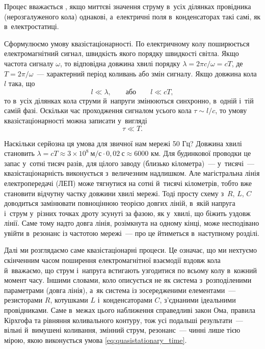 Процес вважається , якщо миттєві значення струму в~усіх ділянках провідника (нерозгалуженого кола) однакові, а~електричні поля в~конденсаторах такі самі, як в~електростатиці.

Сформулюємо умову квазістаціонарності. По електричному колу поширюється електромагнітний сигнал, швидкість якого порядку швидкості світла. Якщо частота сигналу $\omega$, то відповідна довжина хвилі порядку $\lambda = 2\pi c/\omega = cT$, де $T = 2\pi/\omega$~--- характерний період коливань або змін сигналу. Якщо довжина кола $l$ така, що
\begin{equation}\label{eq:quasistationary_condition}
	l \ll \lambda, \qquad \text{або} \qquad l \ll cT,
\end{equation}
то в~усіх ділянках кола струми й~напруги змінюються синхронно, в~одній і~тій самій фазі. Оскільки час проходження сигналом усього кола $\tau \sim l/c$, то умову квазістаціонарності можна записати у~вигляді
\begin{equation}\label{eq:quasistationary_time}
	\tau \ll T.
\end{equation}

\begin{Attention}
	Наскільки серйозна ця умова для звичної нам мережі 50 Гц? Довжина хвилі становить $\lambda = cT \approx 3\times10^{8}\ \text{м/с}\cdot 0{,}02\ \text{с} \approx 6000$ км. Для будинкової проводки це запас у~сотні тисяч разів, для цілого заводу (близько кілометра)~--- у~тисячі~--- квазістаціонарність виконується з~величезним надлишком. Але магістральна лінія електропередачі (ЛЕП) може тягнутися на сотні й~тисячі кілометрів, тобто вже становити відчутну частку довжини хвилі мережі. Тоді просту схему з~$R$, $L$, $C$ доводиться замінювати повноцінною теорією довгих ліній, в~якій напруга і~струм у~різних точках дроту зсунуті за фазою, як у~хвилі, що біжить уздовж лінії. Саме тому надто довга лінія, розімкнута на одному кінці, може несподівано увійти в~резонанс із частотою мережі~--- про це йтиметься в~наступному розділі.
\end{Attention}

Далі ми розглядаємо саме квазістаціонарні процеси. Це означає, що ми нехтуємо скінченним часом поширення електромагнітної взаємодії вздовж кола й~вважаємо, що струм і~напруга встигають узгодитися по всьому колу в~кожний момент часу. Іншими словами, коло описується не як система з~розподіленими параметрами (довга лінія), а~як система із зосередженими елементами~--- резисторами $R$, котушками $L$ і~конденсаторами $C$, з'єднаними ідеальними провідниками. Саме в~межах цього наближення справедливі закон Ома, правила Кірхгофа та рівняння коливального контуру, тож усі подальші результати~--- вільні й~вимушені коливання, змінний струм, резонанс~--- чинні лише тією мірою, якою виконується умова \eqref{eq:quasistationary_time}.


